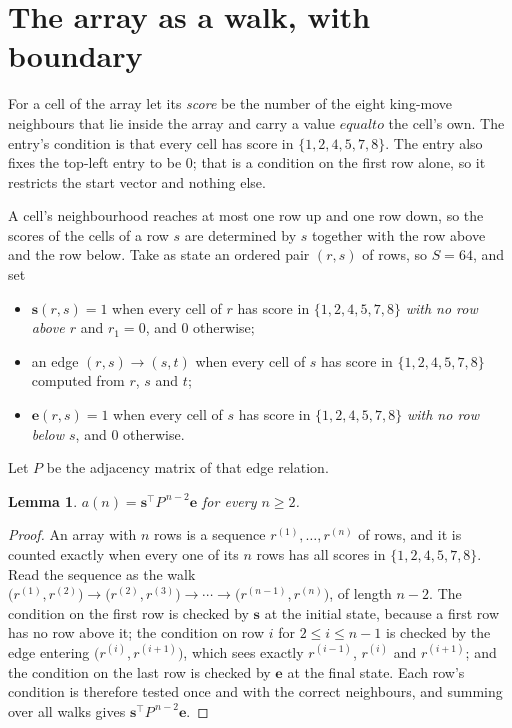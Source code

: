\documentclass[11pt,a4paper]{article}
\theoremstyle{plain}
\newtheorem{lemma}[theorem]{Lemma}
\theoremstyle{definition}
\begin{document}
\section{The array as a walk, with boundary}

For a cell of the array let its \emph{score} be the number of the eight king-move neighbours that lie inside
the array and carry a value $equal to$ the cell's own. The entry's condition is that every cell
has score in $\{1,2,4,5,7,8\}$. The entry also fixes the top-left entry to be $0$; that is a condition on the first row alone, so it restricts the start vector and nothing else.

A cell's neighbourhood reaches at most one row up and one row down, so the scores of the
cells of a row $s$ are determined by $s$ together with the row above and the row below.
Take as state an ordered pair $(r,s)$ of rows, so $S=64$, and set
\begin{itemize}
\item $\mathbf{s}(r,s)=1$ when every cell of $r$ has score in $\{1,2,4,5,7,8\}$ \emph{with no row
above $r$} and $r_1=0$, and $0$ otherwise;
\item an edge $(r,s)\to(s,t)$ when every cell of $s$ has score in $\{1,2,4,5,7,8\}$ computed from
$r$, $s$ and $t$;
\item $\mathbf{e}(r,s)=1$ when every cell of $s$ has score in $\{1,2,4,5,7,8\}$ \emph{with no row
below $s$}, and $0$ otherwise.
\end{itemize}
Let $P$ be the adjacency matrix of that edge relation.

\begin{lemma}\label{lem:walk}
$a(n)=\mathbf{s}^{\!\top}P^{\,n-2}\mathbf{e}$ for every $n\ge2$.
\end{lemma}

\begin{proof}
An array with $n$ rows is a sequence $r^{(1)},\dots,r^{(n)}$ of rows, and it is counted
exactly when every one of its $n$ rows has all scores in $\{1,2,4,5,7,8\}$. Read the sequence as the
walk $\bigl(r^{(1)},r^{(2)}\bigr)\to\bigl(r^{(2)},r^{(3)}\bigr)\to\cdots\to
\bigl(r^{(n-1)},r^{(n)}\bigr)$, of length $n-2$. The condition on the first row is
checked by $\mathbf{s}$ at the initial state, because a first row has no row above it; the
condition on row $i$ for $2\le i\le n-1$ is checked by the edge entering
$\bigl(r^{(i)},r^{(i+1)}\bigr)$, which sees exactly $r^{(i-1)}$, $r^{(i)}$ and
$r^{(i+1)}$; and the condition on the last row is checked by $\mathbf{e}$ at the final
state. Each row's condition is therefore tested once and with the correct neighbours, and
summing over all walks gives $\mathbf{s}^{\!\top}P^{\,n-2}\mathbf{e}$.
\end{proof}
\end{document}
